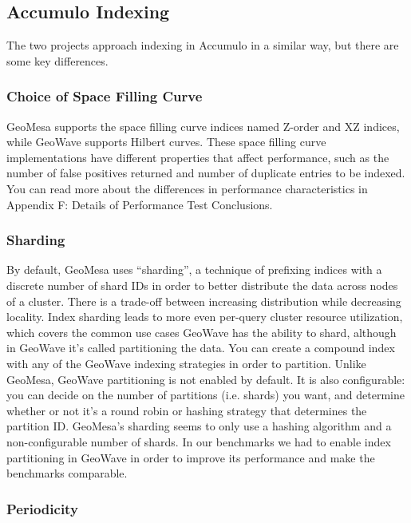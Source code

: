 \subsection{Accumulo Indexing}
\label{sec:featurecompare:indexing}

The two projects approach indexing in Accumulo in a similar way, but there are some key differences.


\subsubsection{Choice of Space Filling Curve}
\label{sec:featurecompare:indexing:curve}

GeoMesa supports the space filling curve indices named Z-order and XZ indices, while GeoWave supports Hilbert curves.
These space filling curve implementations have different properties that affect performance, such as the number of false positives returned and number of duplicate entries to be indexed.
You can read more about the differences in performance characteristics in Appendix F: Details of Performance Test Conclusions.


\subsubsection{Sharding}
\label{sec:featurecompare:indexing:sharding}

By default, GeoMesa uses ``sharding'', a technique of prefixing indices with a discrete number of shard IDs in order to better distribute the data across nodes of a cluster.
There is a trade-off between increasing distribution while decreasing locality.
Index sharding leads to more even per-query cluster resource utilization, which covers the common use cases GeoWave has the ability to shard, although in GeoWave it's called partitioning the data.
You can create a compound index with any of the GeoWave indexing strategies in order to partition.
Unlike GeoMesa, GeoWave partitioning is not enabled by default.
It is also configurable: you can decide on the number of partitions (i.e. shards) you want, and determine whether or not it's a round robin or hashing strategy that determines the partition ID.
GeoMesa's sharding seems to only use a hashing algorithm and a non-configurable number of shards.
In our benchmarks we had to enable index partitioning in GeoWave in order to improve its performance and make the benchmarks comparable.


\subsubsection{Periodicity}
\label{sec:featurecompare:indexing:periodicity}

